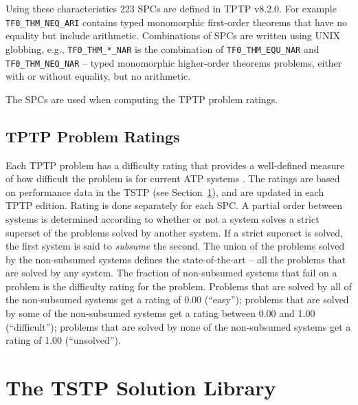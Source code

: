 \documentclass[runningheads]{llncs}
\begin{document}
Using these characteristics 223 SPCs are defined in TPTP v8.2.0. 
For example
{\tt TF0\_THM\_NEQ\_ARI} contains typed monomorphic first-order theorems that have no equality but 
include arithmetic.
Combinations of SPCs are written using UNIX globbing, e.g., {\tt TF0\_THM\_*\_NAR} is the
combination of {\tt TF0\_THM\_EQU\_NAR} and {\tt TF0\_THM\_NEQ\_NAR} -- typed monomorphic 
higher-order theorems problems, either with or without equality, but no arithmetic.

The SPCs are used when computing the TPTP problem ratings.

\subsection{TPTP Problem Ratings}
\label{Ratings}

Each TPTP problem has a difficulty rating that provides a well-defined measure of how difficult 
the problem is for current ATP systems \cite{SS01}.
The ratings are based on performance data in the TSTP (see Section~\ref{TSTP}), and are updated
in each TPTP edition.
Rating is done separately for each SPC.
A partial order between systems is determined according to whether or not a system solves a strict 
superset of the problems solved by another system. 
If a strict superset is solved, the first system is said to {\em subsume} the second. 
The union of the problems solved by the non-subsumed systems defines the state-of-the-art -- all 
the problems that are solved by any system. 
The fraction of non-subsumed systems that fail on a problem is the difficulty rating for the 
problem. 
Problems that are solved by all of the non-subsumed systems get a rating of 0.00 (``easy'');
problems that are solved by some of the non-subsumed systems get a rating between 
0.00 and 1.00 (``difficult''); 
problems that are solved by none of the non-subsumed systems get a rating of 1.00 (``unsolved'').

\section{The TSTP Solution Library}
\label{TSTP}
\end{document}
